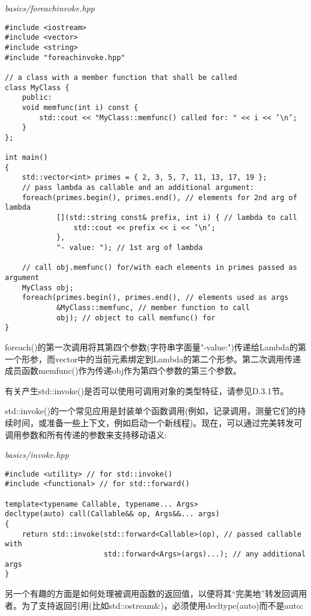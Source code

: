 \noindent
\textit{basics/foreachinvoke.hpp}
\begin{lstlisting}[style=styleCXX]
#include <iostream>
#include <vector>
#include <string>
#include "foreachinvoke.hpp"

// a class with a member function that shall be called
class MyClass {
	public:
	void memfunc(int i) const {
		std::cout << "MyClass::memfunc() called for: " << i << ’\n’;
	}
};

int main()
{
	std::vector<int> primes = { 2, 3, 5, 7, 11, 13, 17, 19 };
	// pass lambda as callable and an additional argument:
	foreach(primes.begin(), primes.end(), // elements for 2nd arg of lambda
			[](std::string const& prefix, int i) { // lambda to call
				std::cout << prefix << i << ’\n’;
			},
			"- value: "); // 1st arg of lambda
			
	// call obj.memfunc() for/with each elements in primes passed as argument
	MyClass obj;
	foreach(primes.begin(), primes.end(), // elements used as args
			&MyClass::memfunc, // member function to call
			obj); // object to call memfunc() for
}
\end{lstlisting}

foreach()的第一次调用将其第四个参数(字符串字面量"-value:")传递给Lambda的第一个形参，而vector中的当前元素绑定到Lambda的第二个形参。第二次调用传递成员函数memfunc()作为传递obj作为第四个参数的第三个参数。

有关产生std::invoke()是否可以使用可调用对象的类型特征，请参见D.3.1节。


std::invoke()的一个常见应用是封装单个函数调用(例如，记录调用，测量它们的持续时间，或准备一些上下文，例如启动一个新线程)。现在，可以通过完美转发可调用参数和所有传递的参数来支持移动语义:

\noindent
\textit{basics/invoke.hpp}
\begin{lstlisting}[style=styleCXX]
#include <utility> // for std::invoke()
#include <functional> // for std::forward()

template<typename Callable, typename... Args>
decltype(auto) call(Callable&& op, Args&&... args)
{
	return std::invoke(std::forward<Callable>(op), // passed callable with
					   std::forward<Args>(args)...); // any additional args
}
\end{lstlisting}

另一个有趣的方面是如何处理被调用函数的返回值，以便将其“完美地”转发回调用者。为了支持返回引用(比如std::ostream\&)，必须使用decltype(auto)而不是auto:

